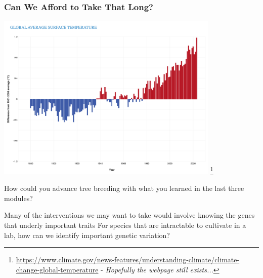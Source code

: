 \documentclass[xcolor=dvipsnames]{beamer}
\newcommand\blfootnote[1]{%
	\begingroup
	\renewcommand\thefootnote{}\footnote{#1}%
	\addtocounter{footnote}{-1}%
	\endgroup
}
\begin{document}
\begin{frame}
\frametitle{Can We Afford to Take That Long?}
\centering
	\includegraphics[keepaspectratio, width  = 0.8\textwidth]{img/graph_globalavgsurfacetemp}
	\blfootnote{\url{https://www.climate.gov/news-features/understanding-climate/climate-change-global-temperature} - \textit{Hopefully the webpage still exists...}}
\end{frame}




\begin{frame}
	\Huge How could you advance tree breeding with what you learned in the last three modules?
\end{frame}

\begin{frame}
	Many of the interventions we may want to take would involve knowing the genes that underly important traits 
	For species that are intractable to cultivate in a lab, how can we identify important genetic variation?
\end{frame}
\end{document}
